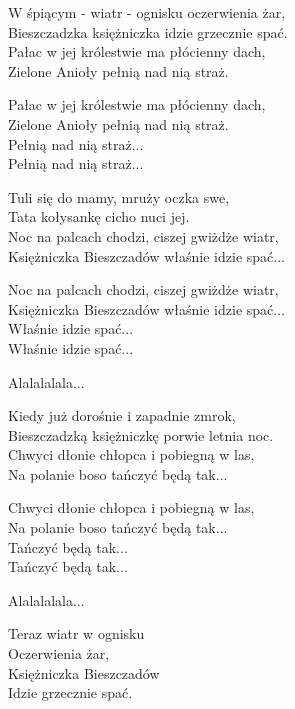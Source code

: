 \begin{text}

    W śpiącym - wiatr - ognisku oczerwienia żar,\\
    Bieszczadzka księżniczka idzie grzecznie spać.\\
    Pałac w jej królestwie ma płócienny dach,\\
    Zielone Anioły pełnią nad nią straż.

    Pałac w jej królestwie ma płócienny dach,\\
    Zielone Anioły pełnią nad nią straż.\\
    Pełnią nad nią straż...\\
    Pełnią nad nią straż...

    Tuli się do mamy, mruży oczka swe,\\
    Tata kołysankę cicho nuci jej.\\
    Noc na palcach chodzi, ciszej gwiżdże wiatr,\\
    Księżniczka Bieszczadów właśnie idzie spać...

    Noc na palcach chodzi, ciszej gwiżdże wiatr,\\
    Księżniczka Bieszczadów właśnie idzie spać...\\
    Właśnie idzie spać...\\
    Właśnie idzie spać...

    Alalalalala...

    Kiedy już dorośnie i zapadnie zmrok,\\
    Bieszczadzką księżniczkę porwie letnia noc.\\
    Chwyci dłonie chłopca i pobiegną w las,\\
    Na polanie boso tańczyć będą tak...

    Chwyci dłonie chłopca i pobiegną w las,\\
    Na polanie boso tańczyć będą tak...\\
    Tańczyć będą tak...\\
    Tańczyć będą tak...

    Alalalalala...

    Teraz wiatr w ognisku\\
    Oczerwienia żar,\\
    Księżniczka Bieszczadów\\
    Idzie grzecznie spać.
\end{text}
